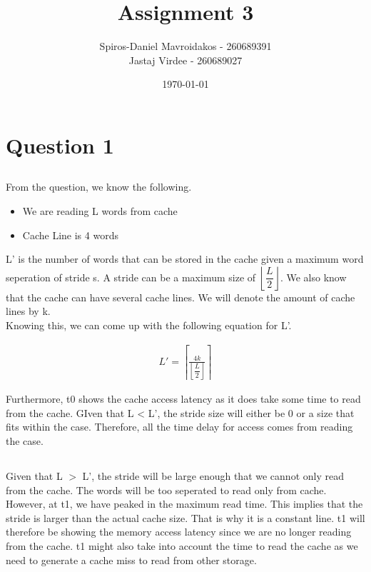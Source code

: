 \documentclass[11pt]{article}
\title{Assignment 3}
\author{Spiros-Daniel Mavroidakos - 260689391\\Jastaj Virdee - 260689027}
\date{\today}
\begin{document}
\maketitle
{}
\newpage
\tableofcontents
\newpage
{}

\section{Question 1}

\subsection{}
From the question, we know the following.
\begin{itemize}
	\item We are reading L words from cache
	\item Cache Line is 4 words
\end{itemize}
L' is the number of words that can be stored in the cache given a maximum word seperation of stride s. A stride can be a maximum size of 
$\left\lfloor\dfrac{L}{2}\right\rfloor$. We also know that the cache can have several cache lines. We will denote the amount of cache lines 
by k. \\
Knowing this, we can come up with the following equation for L'.

\begin{equation}
	\begin{split}
		L' = \left\lceil\frac{4k}{\left\lfloor\dfrac{L}{2}\right\rfloor}\right\rceil
	\end{split}
\end{equation}

Furthermore, t0 shows the cache access latency as it does take some time to read from the cache. GIven that L < L', the stride size will 
either be 0 or a size that fits within the case. Therefore, all the time delay for access comes from reading the case.

\subsection{}
Given that L $>$ L', the stride will be large enough that we cannot only read from the cache. The words will be too seperated to read only 
from cache. However, at t1, we have peaked in the maximum read time. This implies that the stride is larger than the actual cache size. 
That is why it is a constant line. t1 will therefore be showing the memory access latency since we are no longer reading from the cache. 
t1 might also take into account the time to read the cache as we need to generate a cache miss to read from other storage.
\end{document}
